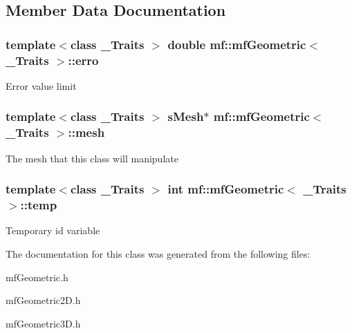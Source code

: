 \subsection{Member Data Documentation}
\hypertarget{classmf_1_1mfGeometric_ad01313f303b880a186b941bc29f6c091}{
\subsubsection[{erro}]{\setlength{\rightskip}{0pt plus 5cm}template$<$class \_\-Traits $>$ double {\bf mf::mfGeometric}$<$ \_\-Traits $>$::{\bf erro}}}
\label{classmf_1_1mfGeometric_ad01313f303b880a186b941bc29f6c091}
Error value limit \hypertarget{classmf_1_1mfGeometric_a32908e210e7cca4625608a14e71403d3}{
\subsubsection[{mesh}]{\setlength{\rightskip}{0pt plus 5cm}template$<$class \_\-Traits $>$ {\bf sMesh}$\ast$ {\bf mf::mfGeometric}$<$ \_\-Traits $>$::{\bf mesh}}}
\label{classmf_1_1mfGeometric_a32908e210e7cca4625608a14e71403d3}
The mesh that this class will manipulate \hypertarget{classmf_1_1mfGeometric_a469d99476c9796b06b2c1392bc5cfcaa}{
\subsubsection[{temp}]{\setlength{\rightskip}{0pt plus 5cm}template$<$class \_\-Traits $>$ int {\bf mf::mfGeometric}$<$ \_\-Traits $>$::{\bf temp}}}
\label{classmf_1_1mfGeometric_a469d99476c9796b06b2c1392bc5cfcaa}
Temporary id variable 

The documentation for this class was generated from the following files:\begin{DoxyCompactItemize}
\item 
mfGeometric.h\item 
mfGeometric2D.h\item 
mfGeometric3D.h\end{DoxyCompactItemize}
